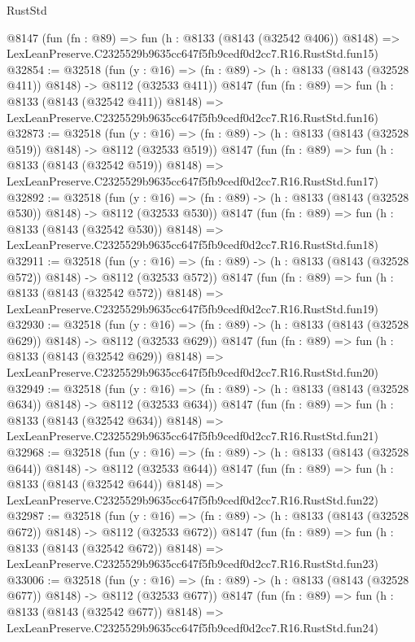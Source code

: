 \begin{lexlean}{RustStd}
\begin{coremodule}
    @8147
    (fun (fn : @89) =>
    fun (h : @8133 (@8143 (@32542 @406)) @8148) =>
    LexLeanPreserve.C2325529b9635cc647f5fb9cedf0d2cc7.R16.RustStd.fun15)
@32854 := @32518
    (fun (y : @16) => (fn : @89) -> (h : @8133 (@8143 (@32528 @411)) @8148) -> @8112 (@32533 @411))
    @8147
    (fun (fn : @89) =>
    fun (h : @8133 (@8143 (@32542 @411)) @8148) =>
    LexLeanPreserve.C2325529b9635cc647f5fb9cedf0d2cc7.R16.RustStd.fun16)
@32873 := @32518
    (fun (y : @16) => (fn : @89) -> (h : @8133 (@8143 (@32528 @519)) @8148) -> @8112 (@32533 @519))
    @8147
    (fun (fn : @89) =>
    fun (h : @8133 (@8143 (@32542 @519)) @8148) =>
    LexLeanPreserve.C2325529b9635cc647f5fb9cedf0d2cc7.R16.RustStd.fun17)
@32892 := @32518
    (fun (y : @16) => (fn : @89) -> (h : @8133 (@8143 (@32528 @530)) @8148) -> @8112 (@32533 @530))
    @8147
    (fun (fn : @89) =>
    fun (h : @8133 (@8143 (@32542 @530)) @8148) =>
    LexLeanPreserve.C2325529b9635cc647f5fb9cedf0d2cc7.R16.RustStd.fun18)
@32911 := @32518
    (fun (y : @16) => (fn : @89) -> (h : @8133 (@8143 (@32528 @572)) @8148) -> @8112 (@32533 @572))
    @8147
    (fun (fn : @89) =>
    fun (h : @8133 (@8143 (@32542 @572)) @8148) =>
    LexLeanPreserve.C2325529b9635cc647f5fb9cedf0d2cc7.R16.RustStd.fun19)
@32930 := @32518
    (fun (y : @16) => (fn : @89) -> (h : @8133 (@8143 (@32528 @629)) @8148) -> @8112 (@32533 @629))
    @8147
    (fun (fn : @89) =>
    fun (h : @8133 (@8143 (@32542 @629)) @8148) =>
    LexLeanPreserve.C2325529b9635cc647f5fb9cedf0d2cc7.R16.RustStd.fun20)
@32949 := @32518
    (fun (y : @16) => (fn : @89) -> (h : @8133 (@8143 (@32528 @634)) @8148) -> @8112 (@32533 @634))
    @8147
    (fun (fn : @89) =>
    fun (h : @8133 (@8143 (@32542 @634)) @8148) =>
    LexLeanPreserve.C2325529b9635cc647f5fb9cedf0d2cc7.R16.RustStd.fun21)
@32968 := @32518
    (fun (y : @16) => (fn : @89) -> (h : @8133 (@8143 (@32528 @644)) @8148) -> @8112 (@32533 @644))
    @8147
    (fun (fn : @89) =>
    fun (h : @8133 (@8143 (@32542 @644)) @8148) =>
    LexLeanPreserve.C2325529b9635cc647f5fb9cedf0d2cc7.R16.RustStd.fun22)
@32987 := @32518
    (fun (y : @16) => (fn : @89) -> (h : @8133 (@8143 (@32528 @672)) @8148) -> @8112 (@32533 @672))
    @8147
    (fun (fn : @89) =>
    fun (h : @8133 (@8143 (@32542 @672)) @8148) =>
    LexLeanPreserve.C2325529b9635cc647f5fb9cedf0d2cc7.R16.RustStd.fun23)
@33006 := @32518
    (fun (y : @16) => (fn : @89) -> (h : @8133 (@8143 (@32528 @677)) @8148) -> @8112 (@32533 @677))
    @8147
    (fun (fn : @89) =>
    fun (h : @8133 (@8143 (@32542 @677)) @8148) =>
    LexLeanPreserve.C2325529b9635cc647f5fb9cedf0d2cc7.R16.RustStd.fun24)

\end{coremodule}
\end{lexlean}
